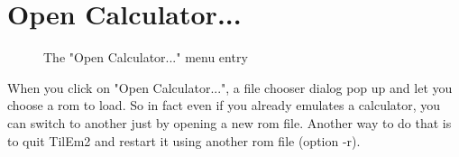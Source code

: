\documentclass[10pt]{report}
\begin{document}
\section{Open Calculator...}

\begin{figure}[H]
\centering
{}
\caption{The "Open Calculator..." menu entry}
\end{figure}
When you click on "Open Calculator...", a file chooser dialog pop up and let you choose a rom to load.\newline
So in fact even if you already emulates a calculator, you can switch to another just by opening a new rom file.\newline
Another way to do that is to quit TilEm2 and restart it using another rom file (option -r).\newline
\end{document}
